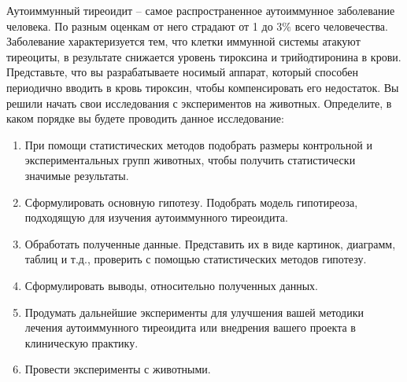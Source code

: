 
Аутоиммунный тиреоидит – самое распространенное аутоиммунное
заболевание человека. По разным оценкам от него страдают от 1 до $3\%$ всего
человечества. Заболевание характеризуется тем, что клетки иммунной системы
атакуют тиреоциты, в результате снижается уровень тироксина и трийодтиронина в
крови. Представьте, что вы разрабатываете носимый аппарат, который способен
периодично вводить в кровь тироксин, чтобы компенсировать его недостаток. Вы
решили начать свои исследования с экспериментов на животных. Определите, в
каком порядке вы будете проводить данное исследование:

\begin{enumerate}
    \item При помощи статистических методов подобрать размеры контрольной и экспериментальных групп животных, чтобы получить статистически значимые результаты.
    \item Сформулировать основную гипотезу. Подобрать модель гипотиреоза, подходящую для изучения аутоиммунного тиреоидита.
    \item Обработать полученные данные. Представить их в виде картинок, диаграмм, таблиц и т.д., проверить с помощью статистических методов гипотезу.
    \item Сформулировать выводы, относительно полученных данных.
    \item Продумать дальнейшие эксперименты для улучшения вашей методики лечения аутоиммунного тиреоидита или внедрения вашего проекта в клиническую практику.
    \item Провести эксперименты с животными.
\end{enumerate}

\explanationSection

